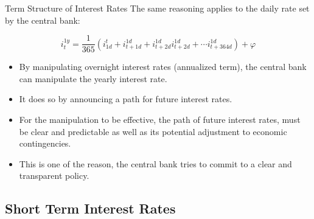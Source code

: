 \documentclass[
  ignorenonframetext,
  aspectratio=169,
]{beamer}
\providecommand{\tightlist}{%
  \setlength{\itemsep}{0pt}\setlength{\parskip}{0pt}}\usepackage{longtable,booktabs,array}
\begin{document}
\begin{frame}{Term Structure of Interest Rates}
The same reasoning applies to the daily rate set by the central bank:

\[i^{1y}_t = \frac{1}{365} \left( i^{t}_{1d}  + i^{1d}_{t+1d}  + i^{1d}_{t+2d}i^{1d}_{t+2d} +  \cdots i^{1d}_{t+364d} \right) + \varphi\]

\begin{itemize}
\tightlist
\item
  By manipulating overnight interest rates (annualized term), the
  central bank can manipulate the yearly interest rate.
\item
  It does so by announcing a path for future interest rates.
\item
  For the manipulation to be effective, the path of future interest
  rates, must be clear and predictable as well as its potential
  adjustment to economic contingencies.
\item
  This is one of the reason, the central bank tries to commit to a clear
  and transparent policy.
\end{itemize}
\end{frame}

\subsection{Short Term Interest
Rates}\label{short-term-interest-rates-1}
\end{document}

